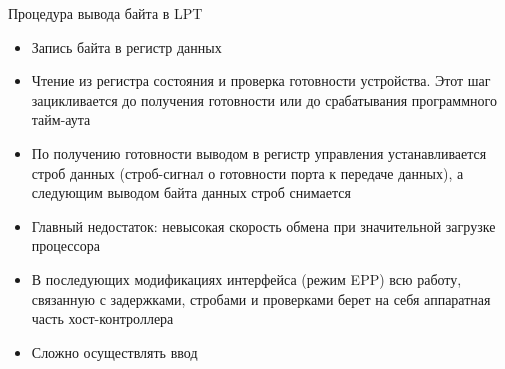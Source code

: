 \documentclass[aspectratio=169,14pt]{beamer}
\begin{document}
\begin{frame}{Процедура вывода байта в LPT}
    \begin{footnotesize}
        \begin{itemize}
            \item Запись байта в регистр данных
            \item Чтение из регистра состояния и проверка
            готовности устройства. Этот шаг зацикливается до
            получения готовности или до срабатывания
            программного тайм-аута
            \item По получению готовности выводом в регистр
            управления устанавливается строб данных (строб-сигнал
            о готовности порта к передаче данных), а следующим
            выводом байта данных строб снимается
            \item Главный недостаток: невысокая скорость обмена при значительной
            загрузке процессора
            \item В последующих модификациях интерфейса (режим EPP) всю
            работу, связанную с задержками, стробами и проверками берет
            на себя аппаратная часть хост-контроллера
            \item Сложно осуществлять ввод
        \end{itemize}
    \end{footnotesize}
\end{frame}
\end{document}
